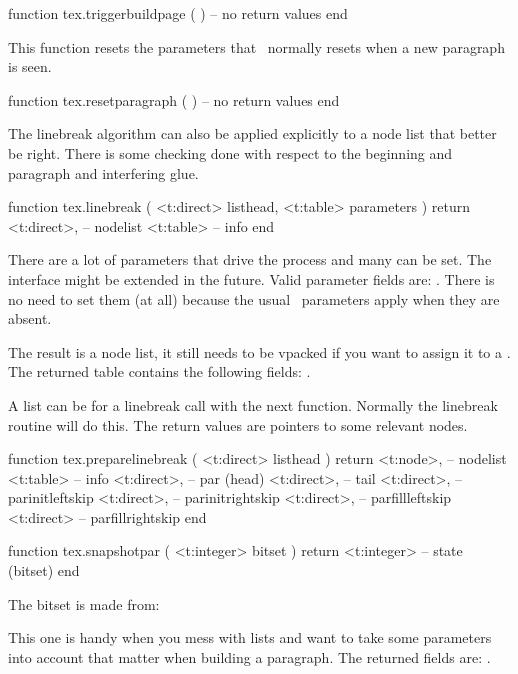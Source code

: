 \starttyping[option=LUA]
function tex.triggerbuildpage ( )
    -- no return values
end
\stoptyping

This function resets the parameters that \TEX\ normally resets when a new paragraph
is seen.

\starttyping[option=LUA]
function tex.resetparagraph ( )
    -- no return values
end
\stoptyping

The linebreak algorithm can also be applied explicitly to a node list that better
be right. There is some checking done with respect to the beginning and paragraph
and interfering glue.

\starttyping[option=LUA]
function tex.linebreak (
    <t:direct> listhead,
    <t:table>  parameters
)
    return
        <t:direct>, -- nodelist
        <t:table>   -- info
end
\stoptyping

There are a lot of parameters that drive the process and many can be set. The
interface might be extended in the future. Valid parameter fields are:
. There is no need to set
them (at all) because the usual \TEX\ parameters apply when they are absent.

The result is a node list, it still needs to be vpacked if you want to assign it
to a \type {\vbox}. The returned  table contains the following fields:
.

A list can be  for a linebreak call with the next function.
Normally the linebreak routine will do this. The return values are pointers to
some relevant nodes.

\starttyping[option=LUA]
function tex.preparelinebreak (
    <t:direct>  listhead
)
    return
        <t:node>, -- nodelist
        <t:table> -- info
        <t:direct>, -- par (head)
        <t:direct>, -- tail
        <t:direct>, -- parinitleftskip
        <t:direct>, -- parinitrightskip
        <t:direct>, -- parfillleftskip
        <t:direct>  -- parfillrightskip
end
\stoptyping

\starttyping[option=LUA]
function tex.snapshotpar ( <t:integer> bitset )
    return <t:integer> -- state (bitset)
end
\stoptyping

The bitset is made from:

\startcolumns[n=3]
\stopcolumns

This one is handy when you mess with lists and want to take some parameters
into account that matter when building a paragraph. The returned fields are:
.

